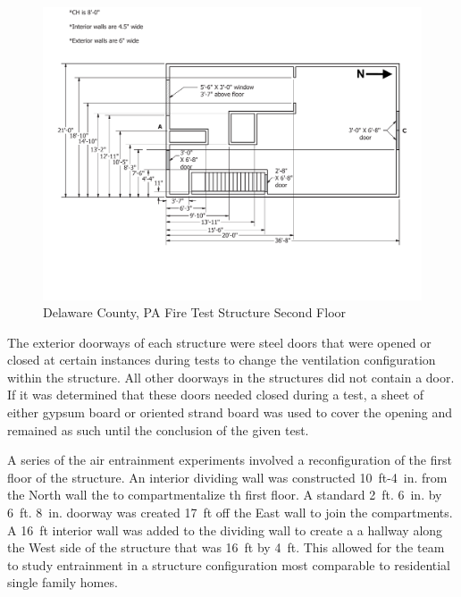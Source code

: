 \documentclass[12pt,oneside]{book}
\begin{document}
\begin{figure}[!ht]
	\centering
	\includegraphics[width=\columnwidth]{Figures/Air_Entrainment/West_Test_Structure_2nd_Floor_nodim.pdf}
	\caption{Delaware County, PA Fire Test Structure Second Floor}
	\label{fig:Delaware_County,_PA_Fire_Test_Structure_Second_Floor}
\end{figure}

The exterior doorways of each structure were steel doors that were opened or closed at certain instances during tests to change the ventilation configuration within the structure. All other doorways in the structures did not contain a door. If it was determined that these doors needed closed during a test, a sheet of either gypsum board or oriented strand board was used to cover the opening and remained as such until the conclusion of the given test.

A series of the air entrainment experiments involved a reconfiguration of the first floor of the structure. An interior dividing wall was constructed 10~ft-4~in. from the North wall the to compartmentalize th first floor. A standard 2~ft. 6~in. by 6~ft. 8~in. doorway was created 17~ft off the East wall to join the compartments. A 16~ft interior wall was added to the dividing wall to create a a hallway along the West side of the structure that was 16~ft by 4~ft. This allowed for the team to study entrainment in a structure configuration most comparable to residential single family homes. 
\end{document}
